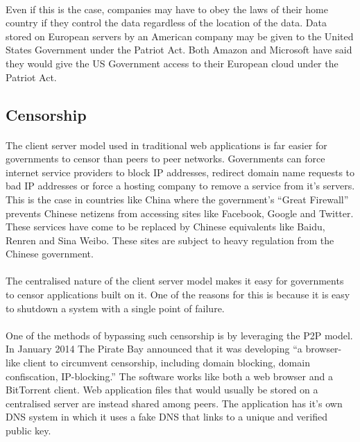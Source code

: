 \documentclass[11pt]{amsart}
\begin{document}
\paragraph{}
Even if this is the case, companies may have to obey the laws of their home country if they control the data regardless of the location of the data. Data stored on European servers by an American company may be given to the United States Government under the Patriot Act. Both Amazon and Microsoft have said they would give the US Government access to their European cloud under the Patriot Act.\cite{Forbes}

\subsection{Censorship}
\paragraph{}
The client server model used in traditional web applications is far easier for governments to censor than peers to peer networks. Governments can force internet service providers to block IP addresses, redirect domain name requests to bad IP addresses or force a hosting company to remove a service from it's servers. This is the case in countries like China where the government's ``Great Firewall'' prevents Chinese netizens from accessing sites like Facebook, Google and Twitter. These services have come to be replaced by Chinese equivalents like Baidu, Renren and Sina Weibo. These sites are subject to heavy regulation from the Chinese government. 
\paragraph{}
The centralised nature of the client server model makes it easy for governments to censor applications built on it. One of the reasons for this is because it is easy to shutdown a system with a single point of failure.
\paragraph{}
One of the methods of bypassing such censorship is by leveraging the P2P model. In January 2014 The Pirate Bay announced that it was developing ``a browser-like client to circumvent censorship, including domain blocking, domain confiscation, IP-blocking.'' The software works like both a web browser and a BitTorrent client. Web application files that would usually be stored on a centralised server are instead shared among peers. The application has it's own DNS system in which it uses a fake DNS that links to a unique and verified public key.\cite{PirateBayBrowser}
\end{document}
